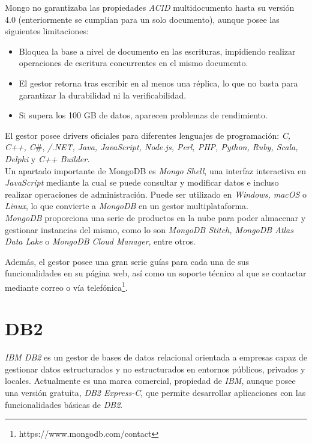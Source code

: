 \documentclass[11pt,a4paper]{article}
\begin{document}
Mongo no garantizaba las propiedades \emph{ACID} multidocumento hasta su versión 4.0 (enteriormente se cumplían para un solo documento), aunque posee las siguientes limitaciones\cite{WIKI:3}: 

\begin{itemize}
	\item Bloquea la base a nivel de documento en las escrituras, impidiendo realizar operaciones de escritura concurrentes en el mismo documento. 
	\item El gestor retorna tras escribir en al menos una réplica, lo que no basta para garantizar la durabilidad ni la verificabilidad.\cite{MDB:9}
	\item Si supera los 100 GB de datos, aparecen problemas de rendimiento.\cite{MDB:10}
\end{itemize}

El gestor posee drivers oficiales para diferentes lenguajes de programación: \emph{C, C++, C}\#, \emph{/.NET, Java, JavaScript, Node.js, Perl, PHP, Python, Ruby, Scala, Delphi} y \emph{C++ Builder.}\\

Un apartado importante de MongoDB es \emph{Mongo Shell}\cite{MDB:6}, una interfaz interactiva en \emph{JavaScript} mediante la cual se puede consultar y modificar datos e incluso realizar operaciones de administración. Puede ser utilizado en \emph{Windows, macOS} o \emph{Linux}, lo que convierte a \emph{MongoDB} en un gestor multiplataforma.\\

\emph{MongoDB} proporciona una serie de productos en la nube para poder almacenar y gestionar instancias del mismo, como lo son \emph{MongoDB Stitch, MongoDB Atlas Data Lake} o \emph{MongoDB Cloud Manager}, entre otros.\cite{MDB:7}

Además, el gestor posee una gran serie guías para cada una de sus funcionalidades en su página web\cite{MDB:8}, así como un soporte técnico al que se contactar mediante correo o vía telefónica\footnote{https://www.mongodb.com/contact}.

\newpage

\section{DB2}

\emph{IBM DB2} es un gestor de bases de datos relacional orientada a empresas capaz de gestionar datos estructurados y no estructurados en entornos públicos, privados y locales.\cite{DB2:1} Actualmente es una marca comercial, propiedad de \emph{IBM}, aunque posee una versión gratuita, \emph{DB2 Express-C}\cite{DB2:2}, que permite desarrollar aplicaciones con las funcionalidades básicas de \emph{DB2}.
\end{document}
